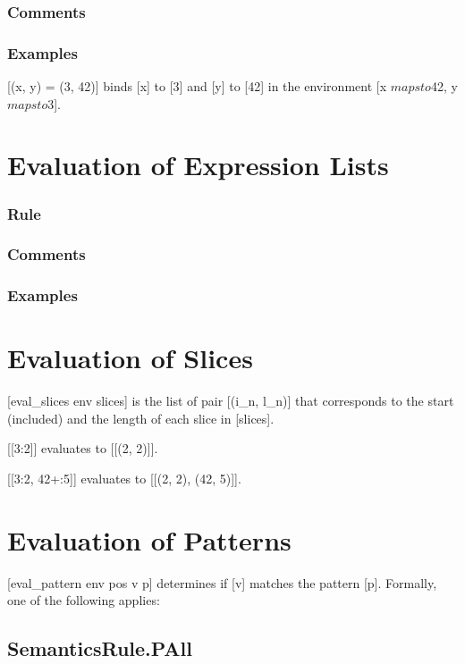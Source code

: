 \documentclass{book}
\begin{document}
    \subsubsection{Comments}

    \subsubsection{Examples}
    [(x, y) = (3, 42)] binds [x] to [3] and [y] to [42] in the environment [x $mapsto$42, y $mapsto$3].

\section{Evaluation of Expression Lists}
  
    \subsubsection{ Rule}

    \subsubsection{ Comments}

    \subsubsection{ Examples}

\section{Evaluation of Slices}
[eval\_slices env slices] is the list of pair [(i\_n, l\_n)] that
corresponds to the start (included) and the length of each slice in
[slices].

[[3:2]] evaluates to [[(2, 2)]].

[[3:2, 42+:5]] evaluates to [[(2, 2), (42, 5)]].

\section{Evaluation of Patterns}
[eval\_pattern env pos v p] determines if [v] matches the pattern [p].
Formally, one of the following applies:

\subsection{SemanticsRule.PAll \label{sec:SemanticsRule.PAll}}
\end{document}
